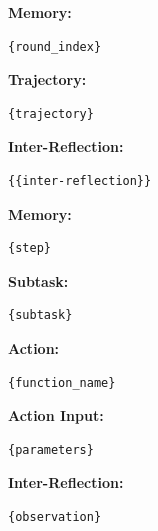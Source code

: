 \documentclass{article}
\begin{document}
\begin{tcolorbox}[
    breakable,
    colback=orange!5!white,
    colframe=orange!75!black,
    title=Long-Term Memory,
    fonttitle=\bfseries
]

\textbf{Memory:}
\begin{Verbatim}
{round_index}
\end{Verbatim}

\textbf{Trajectory:}
\begin{Verbatim}
{trajectory}
\end{Verbatim}

\textbf{Inter-Reflection:}
\begin{Verbatim}
{{inter-reflection}}
\end{Verbatim}

\end{tcolorbox}

\begin{tcolorbox}[
    breakable,
    colback=red!5!white,
    colframe=red!75!black,
    title=Short-Term Memory,
    fonttitle=\bfseries
]

\textbf{Memory:}
\begin{Verbatim}
{step}
\end{Verbatim}

\textbf{Subtask:}
\begin{Verbatim}
{subtask}
\end{Verbatim}

\textbf{Action:}
\begin{Verbatim}
{function_name}
\end{Verbatim}

\textbf{Action Input:}
\begin{Verbatim}
{parameters}
\end{Verbatim}

\textbf{Inter-Reflection:}
\begin{Verbatim}
{observation}
\end{Verbatim}


\end{tcolorbox}
\end{document}
